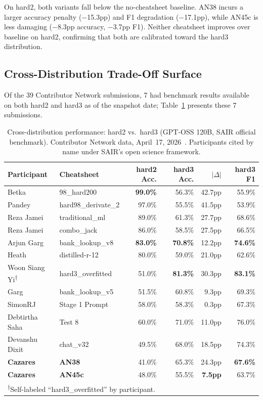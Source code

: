 \documentclass[11pt]{article}
\begin{document}
On hard2, both variants fall below the no-cheatsheet baseline. AN38
incurs a larger accuracy penalty ($-$15.3pp) and F1 degradation
($-$17.1pp), while AN45c is less damaging ($-$8.3pp accuracy,
$-$3.7pp F1). Neither cheatsheet improves over baseline on hard2,
confirming that both are calibrated toward the hard3 distribution.

\subsection{Cross-Distribution Trade-Off Surface}

Of the 39 Contributor Network submissions, 7 had benchmark results
available on both hard2 and hard3 as of the snapshot date;
Table~\ref{tab:crossdist} presents these 7 submissions.

\begin{table}[h]
\centering
\caption{Cross-distribution performance: hard2 vs.\ hard3
(GPT-OSS 120B, SAIR official benchmark). Contributor Network
data, April~17, 2026~\citep{sair2026leaderboard}.
Participants cited by name under SAIR's open science framework.}
\label{tab:crossdist}
\small
\begin{tabular}{llrrrr}
\toprule
Participant & Cheatsheet & hard2 Acc. & hard3 Acc. & $|\Delta|$ & hard3 F1 \\
\midrule
Betka       & 98\_hard200           & \textbf{99.0\%} & 56.3\% & 42.7pp & 55.9\% \\
Pandey      & hard98\_derivate\_2   & 97.0\%          & 55.5\% & 41.5pp & 53.9\% \\
Reza Jamei  & traditional\_ml       & 89.0\%          & 61.3\% & 27.7pp & 68.6\% \\
Reza Jamei  & combo\_jack           & 86.0\%          & 58.5\% & 27.5pp & 66.5\% \\
Arjun Garg  & bank\_lookup\_v8      & \textbf{83.0\%} & \textbf{70.8\%} & 12.2pp & \textbf{74.6\%} \\
Heath       & distilled-r-12        & 80.0\%          & 59.0\% & 21.0pp & 62.6\% \\
Woon Siang Yi\textsuperscript{$\dagger$} & hard3\_overfitted & 51.0\% & \textbf{81.3\%} & 30.3pp & \textbf{83.1\%} \\
Garg        & bank\_lookup\_v5      & 51.5\%          & 60.8\% & 9.3pp  & 69.3\% \\
SimonRJ     & Stage 1 Prompt        & 58.0\%          & 58.3\% & 0.3pp  & 67.3\% \\
Debtirtha Saha & Test 8             & 60.0\%          & 71.0\% & 11.0pp & 76.0\% \\
Devanshu Dixit & chat\_v32          & 49.5\%          & 68.0\% & 18.5pp & 74.3\% \\
\textbf{Cazares} & \textbf{AN38}   & 41.0\%          & 65.3\% & 24.3pp & \textbf{67.6\%} \\
\textbf{Cazares} & \textbf{AN45c}  & 48.0\%          & 55.5\% & \textbf{7.5pp}  & 63.7\% \\
\bottomrule
\multicolumn{6}{l}{\textsuperscript{$\dagger$}Self-labeled ``hard3\_overfitted'' by participant.}
\end{tabular}
\end{table}
\end{document}
